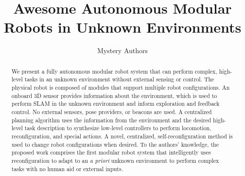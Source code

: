 \documentclass[conference]{IEEEtran}
\begin{document}
\title{Awesome Autonomous Modular Robots in Unknown Environments}

\author{Mystery Authors}


\maketitle

\begin{abstract}

We present a fully autonomous modular robot system that can perform complex, high-level tasks in an unknown environment without external sensing or control. The physical robot is composed of modules that support multiple robot configurations. An onboard 3D sensor provides information about the environment, which is used to perform SLAM in the unknown environment and inform exploration and feedback control. No external sensors, pose providers, or beacons are used. A centralized planning algorithm uses the information from the environment and the desired high-level task description to synthesize low-level controllers to perform locomotion, reconfiguration, and special actions. A novel, centralized, self-reconfiguration method is used to change robot configurations when desired. To the authors' knowledge, the proposed work comprises the first modular robot system that intelligently uses reconfiguration to adapt to an \textit{a priori} unknown environment to perform complex tasks with no human aid or external inputs.



\end{abstract}

\IEEEpeerreviewmaketitle

\end{document}

